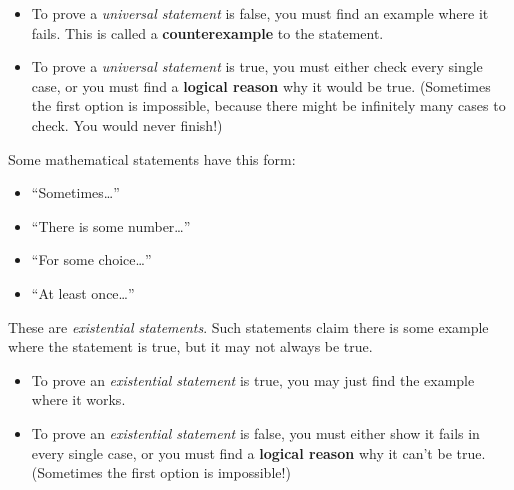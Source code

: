 \documentclass[10pt, reqno]{amsart}
\theoremstyle{remark}
\theoremstyle{definition}
\numberwithin{equation}{section}  %
\begin{document}
\begin{itemize}
\item
To prove a \emph{universal statement} is false, you must find an example where it fails.  This is called a {\bf counterexample} to the statement.
\item
To prove a \emph{universal statement} is true, you must either check every single case, or you must find a {\bf logical reason} why it would be true.  (Sometimes the first option is impossible, because there might be infinitely many cases to check.  You would never finish!)
\end{itemize}


Some mathematical statements have this form:
\begin{itemize}
\item
``Sometimes\dots''
\item
``There is some number\dots''
\item
``For some choice\dots''
\item
``At least once\dots''
\end{itemize} 
These are \emph{existential statements}.  Such statements claim there is some example where the statement  is  true, but it may not always be true.  

\begin{itemize}
\item
To prove an \emph{existential statement} is true, you may just find the example where it works.  
\item
To prove an \emph{existential statement} is false, you must either show it fails in every single case, or you must find a {\bf logical reason} why it can't be true.  (Sometimes the first option is impossible!)
\end{itemize}
\end{document}
